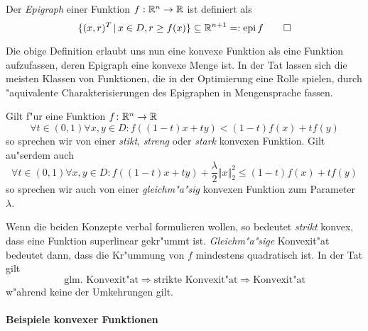 \begin{Definition}[Epigraph]
\label{def:epi}
 Der \emph{Epigraph} einer Funktion $f : \mathbb R^n \to \mathbb R$ ist definiert als
 \begin{equation*}
 	\lbrace (x, r)^T \, \vert \, x \in D, r \geq f(x) \rbrace \subseteq \mathbb R^{n + 1} =: \text{epi}\, f\qedhere
 \end{equation*}
\end{Definition}
\begin{Bemerkung}
	Die obige Definition erlaubt uns nun eine konvexe Funktion als eine Funktion aufzufassen, deren Epigraph eine konvexe Menge ist.
	In der Tat lassen sich die meisten Klassen von Funktionen, die in der Optimierung eine Rolle spielen, durch "aquivalente Charakterisierungen des Epigraphen in Mengensprache fassen.
\end{Bemerkung}
\begin{Definition}
\label{def:str-convty}
 Gilt f"ur eine Funktion $f \colon \mathbb R^n \to \mathbb R$
 \begin{equation*}
 	\forall t \in (0, 1) \forall x,y \in D : f((1 - t)x + ty) < (1 - t)f(x) + tf(y)
 \end{equation*}
 so sprechen wir von einer \emph{stikt}, \emph{streng} oder \emph{stark} konvexen Funktion.
 Gilt au"serdem auch
 \begin{equation*}
 	\forall t \in (0, 1) \forall x,y \in D : f((1 - t)x + ty) + \frac{\lambda}{2}\Vert x \Vert^2_2 \leq (1 - t)f(x) + tf(y)
 \end{equation*}
 so sprechen wir auch von einer \emph{gleichm"a"sig} konvexen Funktion zum Parameter $\lambda$. 
\end{Definition}
\begin{Bemerkung}
	Wenn die beiden Konzepte verbal formulieren wollen, so bedeutet \emph{strikt} konvex, dass eine Funktion superlinear gekr"ummt ist.
	\emph{Gleichm"a"sige} Konvexit"at bedeutet dann, dass die Kr"ummung von $f$ mindestens quadratisch ist.
	In der Tat gilt
	\begin{equation*}
		\text{glm. Konvexit"at} \Rightarrow \text{strikte Konvexit"at} \Rightarrow \text{Konvexit"at}
	\end{equation*}
	w"ahrend keine der Umkehrungen gilt.
\end{Bemerkung}

\paragraph{Beispiele konvexer Funktionen}

